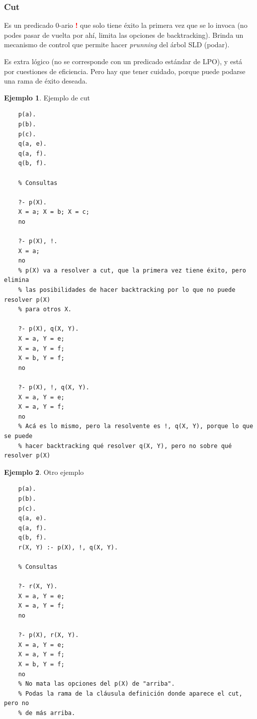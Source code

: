 \documentclass{report}
\theoremstyle{definition} %
\newtheorem*{example*}{Ejemplo}
\newcommand{\changed}[1]{\textcolor{Red}{#1}}
\begin{document}
\subsubsection{Cut}

Es un predicado 0-ario \changed{\textbf{!}} que solo tiene éxito la primera vez
que se lo invoca (no podes pasar de vuelta por ahí, limita las opciones de
backtracking). Brinda un mecanismo de control que permite hacer
\textit{prunning} del árbol SLD (podar).

Es extra lógico (no se corresponde con un predicado estándar de LPO), y está por
cuestiones de eficiencia. Pero hay que tener cuidado, porque puede podarse una
rama de éxito deseada.

\begin{example*}Ejemplo de cut
\begin{verbatim}
    p(a).
    p(b).
    p(c).
    q(a, e).
    q(a, f).
    q(b, f).

    % Consultas

    ?- p(X).
    X = a; X = b; X = c;
    no

    ?- p(X), !.
    X = a;
    no
    % p(X) va a resolver a cut, que la primera vez tiene éxito, pero elimina
    % las posibilidades de hacer backtracking por lo que no puede resolver p(X)
    % para otros X.

    ?- p(X), q(X, Y).
    X = a, Y = e;
    X = a, Y = f;
    X = b, Y = f;
    no

    ?- p(X), !, q(X, Y).
    X = a, Y = e;
    X = a, Y = f;
    no
    % Acá es lo mismo, pero la resolvente es !, q(X, Y), porque lo que se puede
    % hacer backtracking qué resolver q(X, Y), pero no sobre qué resolver p(X)
\end{verbatim}
\end{example*}

\begin{example*}Otro ejemplo
    \begin{verbatim}
    p(a).
    p(b).
    p(c).
    q(a, e).
    q(a, f).
    q(b, f).
    r(X, Y) :- p(X), !, q(X, Y).

    % Consultas

    ?- r(X, Y).
    X = a, Y = e;
    X = a, Y = f;
    no

    ?- p(X), r(X, Y).
    X = a, Y = e;
    X = a, Y = f;
    X = b, Y = f;
    no
    % No mata las opciones del p(X) de "arriba".
    % Podas la rama de la cláusula definición donde aparece el cut, pero no
    % de más arriba.
    \end{verbatim}
    
\end{example*}
\end{document}
